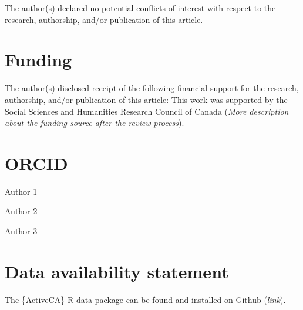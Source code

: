 \documentclass[Royal,times,sageh]{sagej}
\begin{document}
The author(s) declared no potential conflicts of interest with respect
to the research, authorship, and/or publication of this article.

\section{Funding}\label{funding}

The author(s) disclosed receipt of the following financial support for
the research, authorship, and/or publication of this article: This work
was supported by the Social Sciences and Humanities Research Council of
Canada (\emph{More description about the funding source after the review
process}).

\section{ORCID}\label{orcid}

Author 1

Author 2

Author 3

\section{Data availability statement}\label{data-availability-statement}

The \{ActiveCA\} R data package can be found and installed on Github
(\emph{link}).



\end{document}
